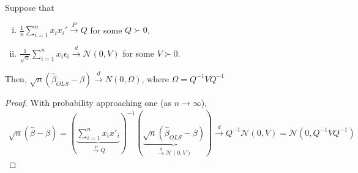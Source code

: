 \documentclass[11pt]{elegantbook}
\begin{document}
\begin{lemma}
    Suppose that
    \begin{enumerate}[(i).]
        \item $\frac{1}{n}\sum_{i=1}^n x_ix_i' \stackrel{P}{\longrightarrow} Q$ for some $Q\succ 0$.
        \item $\frac{1}{\sqrt{n}}\sum_{i=1}^n x_i\epsilon_i \stackrel{d}{\longrightarrow} \mathcal{N}(0,V)$ for some $V\succ 0$.
    \end{enumerate}
    Then, $\sqrt{n}\left(\hat{\beta}_{OLS}-\beta\right) \stackrel{d}{\longrightarrow} N\left(0,\Omega\right)$, where $\Omega=Q^{-1} V Q^{-1}$
\end{lemma}
\begin{proof}
    With probability approaching one (as $n\to\infty$),
    \begin{equation}
        \begin{aligned}
            \sqrt{n}(\hat{\beta}-\beta)=\left(\underbrace{\sum_{i=1}^n x_ix'_i}_{\stackrel{P}{\longrightarrow} Q}\right)^{-1}\left(\underbrace{\sqrt{n}\left(\hat{\beta}_{OLS}-\beta\right)}_{\stackrel{d}{\longrightarrow} \mathcal{N}(0,V)}\right)\stackrel{d}{\longrightarrow} Q^{-1}\mathcal{N}(0,V)=\mathcal{N}(0,Q^{-1}VQ^{-1})
        \end{aligned}
        \nonumber
    \end{equation}
\end{proof}
\end{document}
